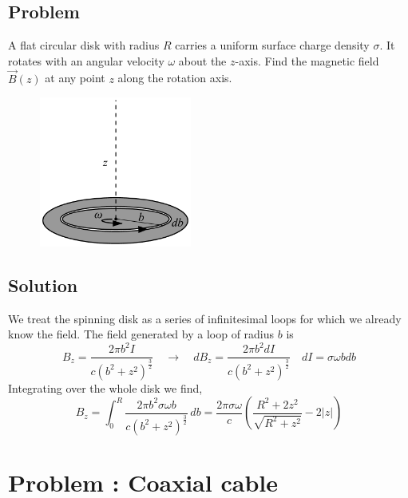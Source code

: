 \documentclass[solutions]{esg8022pset}
\begin{document}
\subsection{Problem}
  A flat circular disk with radius $R$ carries a uniform surface charge density
  $\sigma$. It rotates with an angular velocity $\omega$ about the $z$-axis.
  Find the magnetic field $\vec{B}(z)$ at any point $z$ along the rotation
  axis.
  \begin{figure}[H]
    \centering
    \includegraphics[width = 5cm]{Spinningdisk}
  \end{figure}
\subsection{Solution}
  We treat the spinning disk as a series of infinitesimal loops for which we
  already know the field. The field generated by a loop of radius $b$ is
  $$B_z = \frac{2\pi b^2 I}{c(b^2+z^2)^{\frac{3}{2}}}\quad\to\quad dB_z = \frac{2\pi b^2 dI}{c(b^2+z^2)^{\frac{3}{2}}} \quad dI = \sigma\omega bdb$$
  Integrating over the whole disk we find,
  $$B_z = \int_0^R \frac{2\pi b^2 \sigma\omega b}{c(b^2+z^2)^{\frac{3}{2}}}\,db =
  \frac{2\pi\sigma\omega}{c}\left(\frac{R^2+2z^2}{\sqrt{R^2+z^2}}-2|z|\right)
  $$
\section{Problem \thesection: Coaxial cable}
\end{document}
